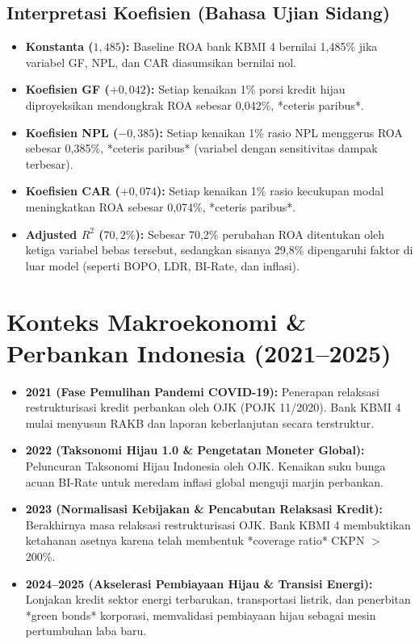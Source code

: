\documentclass[11pt,a4paper]{article}
\begin{document}
\subsection{Interpretasi Koefisien (Bahasa Ujian Sidang)}
\begin{itemize}
    \item \textbf{Konstanta ($1{,}485$):} Baseline ROA bank KBMI 4 bernilai 1,485\% jika variabel GF, NPL, dan CAR diasumsikan bernilai nol.
    \item \textbf{Koefisien GF ($+0{,}042$):} Setiap kenaikan 1\% porsi kredit hijau diproyeksikan mendongkrak ROA sebesar 0,042\%, *ceteris paribus*.
    \item \textbf{Koefisien NPL ($-0{,}385$):} Setiap kenaikan 1\% rasio NPL menggerus ROA sebesar 0,385\%, *ceteris paribus* (variabel dengan sensitivitas dampak terbesar).
    \item \textbf{Koefisien CAR ($+0{,}074$):} Setiap kenaikan 1\% rasio kecukupan modal meningkatkan ROA sebesar 0,074\%, *ceteris paribus*.
    \item \textbf{Adjusted $R^2$ ($70{,}2\%$):} Sebesar 70,2\% perubahan ROA ditentukan oleh ketiga variabel bebas tersebut, sedangkan sisanya 29,8\% dipengaruhi faktor di luar model (seperti BOPO, LDR, BI-Rate, dan inflasi).
\end{itemize}

\section{Konteks Makroekonomi \& Perbankan Indonesia (2021--2025)}

\begin{itemize}
    \item \textbf{2021 (Fase Pemulihan Pandemi COVID-19):} Penerapan relaksasi restrukturisasi kredit perbankan oleh OJK (POJK 11/2020). Bank KBMI 4 mulai menyusun RAKB dan laporan keberlanjutan secara terstruktur.
    \item \textbf{2022 (Taksonomi Hijau 1.0 \& Pengetatan Moneter Global):} Peluncuran Taksonomi Hijau Indonesia oleh OJK. Kenaikan suku bunga acuan BI-Rate untuk meredam inflasi global menguji marjin perbankan.
    \item \textbf{2023 (Normalisasi Kebijakan \& Pencabutan Relaksasi Kredit):} Berakhirnya masa relaksasi restrukturisasi OJK. Bank KBMI 4 membuktikan ketahanan asetnya karena telah membentuk *coverage ratio* CKPN $>$ 200\%.
    \item \textbf{2024--2025 (Akselerasi Pembiayaan Hijau \& Transisi Energi):} Lonjakan kredit sektor energi terbarukan, transportasi listrik, dan penerbitan *green bonds* korporasi, memvalidasi pembiayaan hijau sebagai mesin pertumbuhan laba baru.
\end{itemize}
\end{document}
